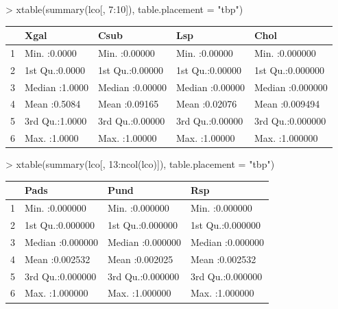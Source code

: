 \documentclass[11pt]{amsart}
\begin{document}
\begin{Schunk}
\begin{Sinput}
> xtable(summary(lco[, 7:10]), table.placement = "tbp")
\end{Sinput}
\begin{table}[ht]
\begin{center}
\begin{tabular}{rllll}
  \hline
 &      Xgal &      Csub &      Lsp &      Chol \\ 
  \hline
1 & Min.   :0.0000   & Min.   :0.00000   & Min.   :0.00000   & Min.   :0.000000   \\ 
  2 & 1st Qu.:0.0000   & 1st Qu.:0.00000   & 1st Qu.:0.00000   & 1st Qu.:0.000000   \\ 
  3 & Median :1.0000   & Median :0.00000   & Median :0.00000   & Median :0.000000   \\ 
  4 & Mean   :0.5084   & Mean   :0.09165   & Mean   :0.02076   & Mean   :0.009494   \\ 
  5 & 3rd Qu.:1.0000   & 3rd Qu.:0.00000   & 3rd Qu.:0.00000   & 3rd Qu.:0.000000   \\ 
  6 & Max.   :1.0000   & Max.   :1.00000   & Max.   :1.00000   & Max.   :1.000000   \\ 
   \hline
\end{tabular}
\end{center}
\end{table}\end{Schunk}

\begin{Schunk}
\begin{Sinput}
> xtable(summary(lco[, 13:ncol(lco)]), table.placement = "tbp")
\end{Sinput}
\begin{table}[ht]
\begin{center}
\begin{tabular}{rlll}
  \hline
 &      Pads &      Pund &      Rsp \\ 
  \hline
1 & Min.   :0.000000   & Min.   :0.000000   & Min.   :0.000000   \\ 
  2 & 1st Qu.:0.000000   & 1st Qu.:0.000000   & 1st Qu.:0.000000   \\ 
  3 & Median :0.000000   & Median :0.000000   & Median :0.000000   \\ 
  4 & Mean   :0.002532   & Mean   :0.002025   & Mean   :0.002532   \\ 
  5 & 3rd Qu.:0.000000   & 3rd Qu.:0.000000   & 3rd Qu.:0.000000   \\ 
  6 & Max.   :1.000000   & Max.   :1.000000   & Max.   :1.000000   \\ 
   \hline
\end{tabular}
\end{center}
\end{table}\end{Schunk}
\end{document}
